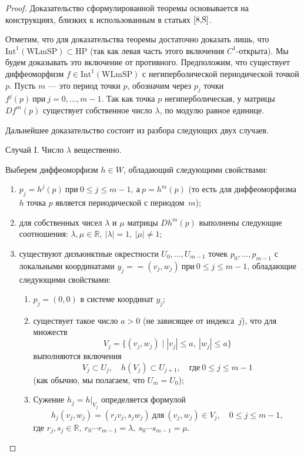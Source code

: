 \documentclass[12pt]{article}
\begin{document}
\begin{proof}
Доказательство сформулированной теоремы основывается на конструкциях, близких к использованным в статьях $\cite{8,S}$.

Отметим, что для доказательства теоремы достаточно доказать лишь, что $\mbox{Int}^1(\mbox{WLmSP})\subset\mbox{HP}$ (так как левая часть этого включения $C^1$-открыта).
Мы будем доказывать это включение от противного. Предположим, что существует диффеоморфизм $f\in\mbox{Int}^1(\mbox{WLmSP})$ с негиперболической периодической точкой $p$.
Пусть $m$ --- это период точки $p$, обозначим через $p_j$ точки $f^j(p)\ \mbox{при}\ j=0,\ldots,m-1$.
 Так как точка $p$ негиперболическая, у матрицы $Df^m(p)$ существует собственное число $\lambda$, по модулю равное единице.
 
 Дальнейшее доказательство состоит из разбора следующих двух случаев.
 
 Случай I. Число $\lambda$ вещественно.

 Выберем диффеоморфизм $h\!\in\! W$, обладающий следующими свойствами:
\begin{enumerate}
\item[(h1)]$p_j=h^j(p)\ \textrm{при}\ 0\leq j\leq m-1,\ \textrm{а} \ p=h^m(p)$ (то есть для диффеоморфизма $h$ точка $p$ является периодической с периодом~$m$);
\item[(h2)] для собственных чисел $\lambda$ и $\mu$ матрицы $Dh^m(p)$ выполнены следующие соотношения: $\lambda,\mu\in\mathbb{R},\ |\lambda|=1,\ |\mu|\neq 1$;
\item[(h3)] существуют дизъюнктные окрестности $U_0,\ldots,U_{m-1}$ точек $p_0,\ldots,p_{m-1}$ с локальными координатами $y_j=\allowbreak=(v_j,w_j)\ \textrm{при}\ 0\leq j\leq m-1$, обладающие следующими свойствами:
\begin{enumerate}
\item[(h3.1)] $p_j=(0,0)$ в системе координат $y_j$;
\item[(h3.2)] существует такое число $a>0$ (не зависящее от индекса~$j$), что для множеств 
$$V_j=\{(v_j,w_j)\mid |v_j|\leq a,\ |w_j|\leq a\}$$
выполняются включения 
$$V_j\subset U_j,\quad h(V_j)\subset U_{j+1},\quad\textrm{где}\ 0\leq j\leq m-1$$
(как обычно, мы полагаем, что $U_m=U_0$);
\item[(h3.3)] Сужение $h_j=h|_{V_j}$ определяется формулой
$$h_j(v_j,w_j)=(r_jv_j,s_jw_j)\ \textrm{для}\ (v_j,w_j)\in V_j,\quad 0\leq j\leq m-1,$$
где $r_j,s_j\in\mathbb{R},\ r_0\cdots r_{m-1}=\lambda,\ s_0\cdots s_{m-1}=\mu$. 
\end{enumerate}
\end{enumerate}


\end{proof}
\end{document}
